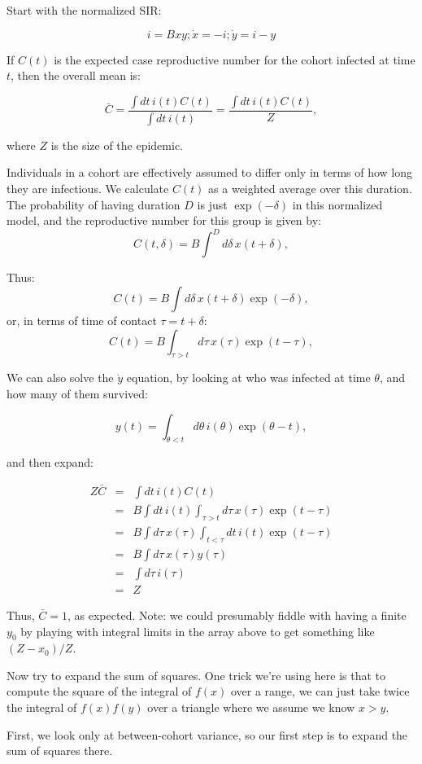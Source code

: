 \documentclass[12pt]{article}
\begin{document}
Start with the normalized SIR:

$$ i = Bxy; \dot x = -i; \dot y = i-y $$

If $C(t)$ is the expected case reproductive number for the cohort infected at time $t$, then the overall mean is:

$$
	\bar C
	= \frac{\int{dt\, i(t) C(t)}}{\int{dt\, i(t)}}
	= \frac{\int{dt\, i(t) C(t)}}{Z},
$$

where $Z$ is the size of the epidemic.

Individuals in a cohort are effectively assumed to differ only in terms of how long they are infectious. We calculate $C(t)$ as a weighted average over this duration. The probability of having duration $D$ is just $\exp(-\delta)$ in this normalized model, and the reproductive number for this group is given by:
$$C(t, \delta) = B \int^D{d\delta\, x(t+\delta)}, $$

Thus: 
$$C(t) = B \int{d\delta\, x(t+\delta) \exp(-\delta)}, $$
or, in terms of time of contact $\tau=t+\delta$:
$$C(t) = B \int_{\tau>t}{d\tau\, x(\tau) \exp(t-\tau)}, $$

We can also solve the $\dot y$ equation, by looking at who was infected at time $\theta$, and how many of them survived:

$$ y(t) = \int_{\theta<t}{d\theta\, i(\theta)\exp(\theta-t)},$$

and then expand:

\begin{eqnarray}
	Z \bar C
	&=& \int{dt\, i(t) C(t)}
	\\ &=& B \int{dt\, i(t) \int_{\tau>t}{d\tau\, x(\tau) \exp(t-\tau)}}
	\\ &=& B \int{d\tau\, x(\tau) \int_{t<\tau}dt\, i(t) \exp(t-\tau)}
	\\ &=& B \int{d\tau\, x(\tau) y(\tau)}
	\\ &=& \int{d\tau\, i(\tau)}
	\\ &=& Z
\end{eqnarray}

Thus, $\bar C = 1$, as expected. Note: we could presumably fiddle with having a finite $y_0$ by playing with integral limits in the array above to get something like $(Z-x_0)/Z$.

Now try to expand the sum of squares. One trick we're using here is that to compute the square of the integral of $f(x)$ over a range, we can just take twice the integral of $f(x)f(y)$ over a triangle where we assume we know $x>y$.

First, we look only at between-cohort variance, so our first step is to expand the sum of squares there.
\end{document}
